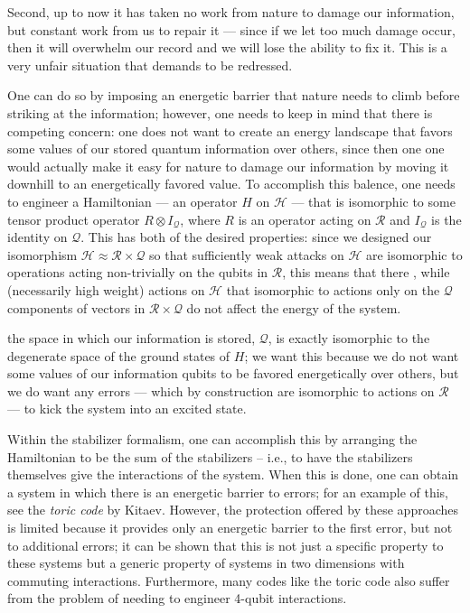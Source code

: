 \documentclass[twocolumn,showpacs,preprintnumbers,amsmath,amssymb,nofootinbib,pra,floatfix]{revtex4}
\begin{document}
Second, up to now it has taken no work from nature to damage our information, but constant work from us to repair it --- since if we let too much damage occur, then it will overwhelm our record and we will lose the ability to fix it.  This is a very unfair situation that demands to be redressed.


  One can do so by imposing an energetic barrier that nature needs to climb before striking at the information;  however, one needs to keep in mind that there is competing concern:  one does not want to create an energy landscape that favors some values of our stored quantum information over others, since then one one would actually make it easy for nature to damage our information by moving it downhill to an energetically favored value.  To accomplish this balence, one needs to engineer a Hamiltonian --- an operator $H$ on $\mathscr{H}$ --- that is isomorphic to some tensor product operator $R\otimes I_{\mathscr{Q}}$, where $R$ is an operator acting on $\mathscr{R}$ and $I_{\mathscr{Q}}$ is the identity on $\mathscr{Q}$.  This has both of the desired properties:  since we designed our isomorphism $\mathscr{H}\approx \mathscr{R}\times\mathscr{Q}$ so that sufficiently weak attacks on $\mathscr{H}$ are isomorphic to operations acting non-trivially on the qubits in $\mathscr{R}$, this means that there , while (necessarily high weight) actions on $\mathscr{H}$ that isomorphic to actions only on the $\mathscr{Q}$ components of vectors in $\mathscr{R}\times\mathscr{Q}$ do not affect the energy of the system.

the space in which our information is stored, $\mathscr{Q}$, is exactly isomorphic to the degenerate space of the ground states of $H$;  we want this because we do not want some values of our information qubits to be favored energetically over others, but we do want any errors --- which by construction are isomorphic to actions on $\mathscr{R}$ --- to kick the system into an excited state.




Within the stabilizer formalism, one can accomplish this by arranging the Hamiltonian to be the sum of the stabilizers -- i.e., to have the stabilizers themselves give the interactions of the system.  When this is done, one can obtain a system in which there is an energetic barrier to errors;  for an example of this, see  the \emph{toric code} by Kitaev.  However, the protection offered by these approaches is limited because it  provides only an energetic barrier to the first error, but not to additional errors; it can be shown that this is not just a specific property to these systems but a generic property of systems in two dimensions with commuting interactions.  Furthermore, many codes like the toric code also suffer from the problem of needing to engineer 4-qubit interactions.
\end{document}
